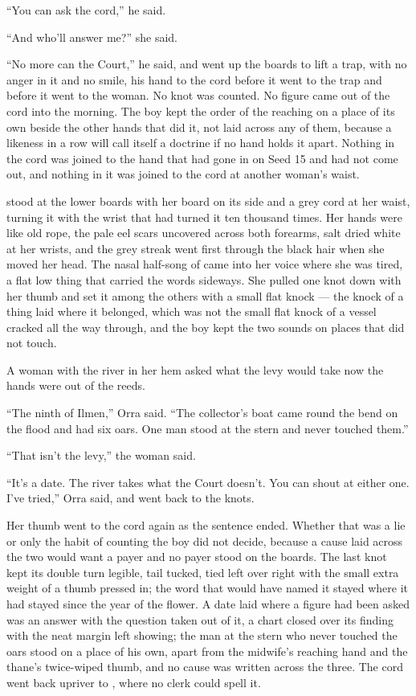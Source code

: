 “You can ask the cord,” he said.

“And who'll answer me?” she said.

“No more can the Court,” he said, and went up the boards to lift a trap, with no anger in it and no smile, his hand to the cord before it went to the trap and before it went to the woman. No knot was counted. No figure came out of the cord into the morning. The boy kept the order of the reaching on a place of its own beside the other hands that did it, not laid across any of them, because a likeness in a row will call itself a doctrine if no hand holds it apart. Nothing in the cord was joined to the hand that had gone in on Seed 15 and had not come out, and nothing in it was joined to the cord at another woman's waist.

 stood at the lower boards with her board on its side and a grey cord at her waist, turning it with the wrist that had turned it ten thousand times. Her hands were like old rope, the pale eel scars uncovered across both forearms, salt dried white at her wrists, and the grey streak went first through the black hair when she moved her head. The nasal half-song of  came into her voice where she was tired, a flat low thing that carried the words sideways. She pulled one knot down with her thumb and set it among the others with a small flat knock — the knock of a thing laid where it belonged, which was not the small flat knock of a vessel cracked all the way through, and the boy kept the two sounds on places that did not touch.

A woman with the river in her hem asked what the levy would take now the hands were out of the reeds.

“The ninth of Ilmen,” Orra said. “The collector's boat came round the bend on the flood and had six oars. One man stood at the stern and never touched them.”

“That isn't the levy,” the woman said.

“It's a date. The river takes what the Court doesn't. You can shout at either one. I've tried,” Orra said, and went back to the knots.

Her thumb went to the cord again as the sentence ended. Whether that was a lie or only the habit of counting the boy did not decide, because a cause laid across the two would want a payer and no payer stood on the boards. The last knot kept its double turn legible, tail tucked, tied left over right with the small extra weight of a thumb pressed in; the word that would have named it stayed where it had stayed since the year of the flower. A date laid where a figure had been asked was an answer with the question taken out of it, a chart closed over its finding with the neat margin left showing; the man at the stern who never touched the oars stood on a place of his own, apart from the midwife's reaching hand and the thane's twice-wiped thumb, and no cause was written across the three. The cord went back upriver to , where no clerk could spell it.

